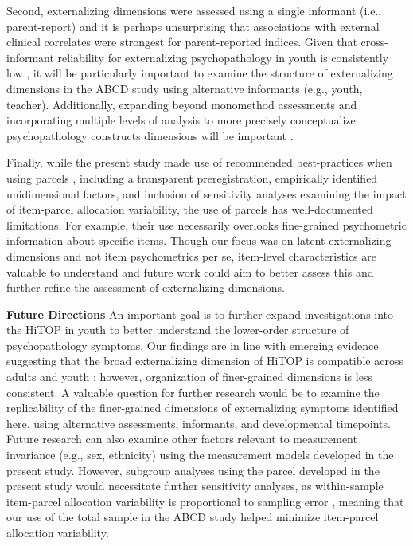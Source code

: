 \documentclass[
  20pt,
  number,
  preprint,
  3p,
  twocolumn]{elsarticle}
\begin{document}
Second, externalizing dimensions were assessed using a single informant
(i.e., parent-report) and it is perhaps unsurprising that associations
with external clinical correlates were strongest for parent-reported
indices. Given that cross-informant reliability for externalizing
psychopathology in youth is consistently low \citep{reyes2004}, it will
be particularly important to examine the structure of externalizing
dimensions in the ABCD study using alternative informants (e.g., youth,
teacher). Additionally, expanding beyond monomethod assessments and
incorporating multiple levels of analysis to more precisely
conceptualize psychopathology constructs dimensions will be important
\citep[e.g.,][]{joyner2023}.

Finally, while the present study made use of recommended best-practices
when using parcels \citep[see][]{sterba2023}, including a transparent
preregistration, empirically identified unidimensional factors, and
inclusion of sensitivity analyses examining the impact of item-parcel
allocation variability, the use of parcels has well-documented
limitations. For example, their use necessarily overlooks fine-grained
psychometric information about specific items. Though our focus was on
latent externalizing dimensions and not item psychometrics per se,
item-level characteristics are valuable to understand and future work
could aim to better assess this and further refine the assessment of
externalizing dimensions.

\textbf{Future Directions} An important goal is to further expand
investigations into the HiTOP in youth to better understand the
lower-order structure of psychopathology symptoms. Our findings are in
line with emerging evidence suggesting that the broad externalizing
dimension of HiTOP is compatible across adults and youth
\citep[e.g.,][]{michelini2019, forbes2023}; however, organization of
finer-grained dimensions is less consistent. A valuable question for
further research would be to examine the replicability of the
finer-grained dimensions of externalizing symptoms identified here,
using alternative assessments, informants, and developmental timepoints.
Future research can also examine other factors relevant to measurement
invariance (e.g., sex, ethnicity) using the measurement models developed
in the present study. However, subgroup analyses using the parcel
developed in the present study would necessitate further sensitivity
analyses, as within-sample item-parcel allocation variability is
proportional to sampling error \citep{sterba2010}, meaning that our use
of the total sample in the ABCD study helped minimize item-parcel
allocation variability.
\end{document}

